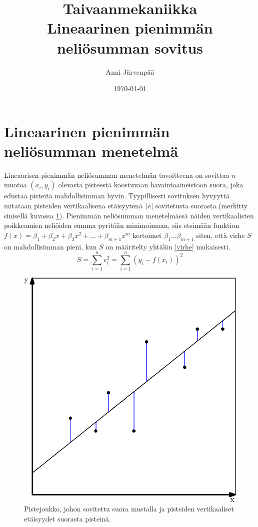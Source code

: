 \documentclass[12pt,a4paper,titlepage]{article}
\title{Taivaanmekaniikka \\ Lineaarinen pienimmän neliösumman sovitus \vspace{0.5em}}
\author{\begin{tabular}{c}
Anni Järvenpää
\end{tabular}}
\date{\today}
\begin{document}
\maketitle

\section{Lineaarinen pienimmän neliösumman menetelmä}
Lineaarisen pienimmän neliösumman menetelmän tavoitteena on sovittaa $n$ muotoa $(x_i, y_i)$ olevasta pisteestä koostuvaan havaintoaineistoon suora, joka edustaa pisteitä mahdollisimman hyvin. Tyypillisesti sovituksen hyvyyttä mitataan pisteiden vertikaalisena etäi\-syytenä~$|e|$ sovitetusta suorasta (merkitty sinisellä kuvassa \ref{vertikaalietaisyys}). Pienimmän neliösumman menetelmässä näiden vertikaalisten poikkeamien neliöiden summa pyritään minimoimaan, siis etsimään funktion $f(x) = \beta_1 + \beta_2 x + \beta_3 x^2 + ... + \beta_{m+1} x^m$ kertoimet $\beta_1 ... \beta_{m+1}$ siten, että virhe $S$ on mahdollisimman pieni, kun $S$ on määritelty yhtälön \ref{virhe} mukaisesti.~\cite{basicideas}
\begin{equation} \label{virhe}
	S = \sum\limits_{i=1}^{n} e_i^2 = \sum\limits_{i=1}^{n} (y_i - f(x_i))^2
\end{equation}

\begin{figure}
\centering
\includegraphics{vertikaalietaisyys.eps}
\caption{Pistejoukko, johon sovitettu suora mustalla ja pisteiden vertikaaliset etäisyydet suorasta pisteinä.}
\label{vertikaalietaisyys}
\end{figure}
\end{document}
